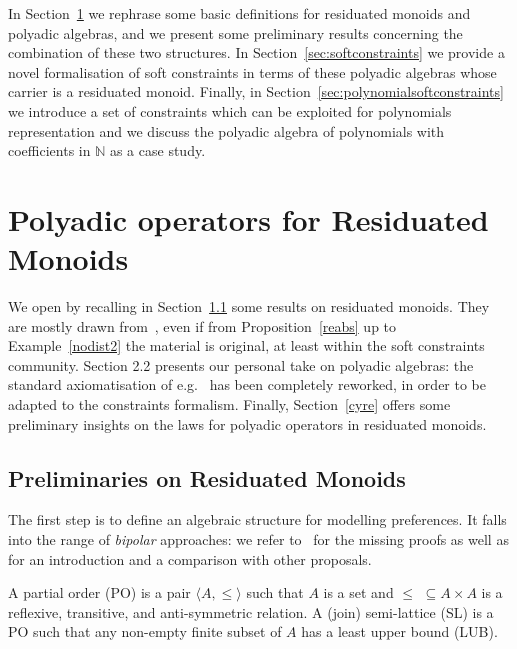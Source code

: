 \documentclass{llncs}
\begin{document}
In Section~\ref{sec:bg} we rephrase some basic definitions for residuated monoids and polyadic algebras, and we present some preliminary results concerning the combination of 
these two structures.
%
In Section~\ref{sec:softconstraints} we provide a novel formalisation of soft constraints in terms of these polyadic algebras whose carrier is a residuated monoid. 
%
Finally, in Section~\ref{sec:polynomialsoftconstraints} we introduce a set of constraints which can be exploited for polynomials representation and we discuss the polyadic algebra of polynomials with coefficients in $\mathbb{N}$ as a case study.

\section{Polyadic operators for Residuated Monoids}\label{sec:bg}

We open by recalling in Section~\ref{sec:lem} some results on residuated monoids.
%
They are mostly drawn from~\cite{jlamp17}, even if from Proposition~\ref{reabs}
up to Example~\ref{nodist2} the material is original, at least within the
soft constraints community.
%
Section 2.2 presents our personal take on polyadic algebras:
the standard axiomatisation of e.g.~\cite{sagi2013} has been completely 
reworked, in order 
to be adapted to the constraints formalism.
%
Finally, Section~\ref{cyre} offers some preliminary insights on 
the laws for polyadic operators in residuated monoids.

\subsection{Preliminaries on Residuated Monoids}\label{sec:lem}

The first step is to define an algebraic structure for modelling preferences. 
It falls into the range of \emph{bipolar} approaches: we refer to~\cite{ipl17} 
for the missing proofs as well as for an introduction and a comparison with other proposals.

\begin{definition}[orders]
	A partial order (PO) is a pair $\langle A, \leq \rangle$ such that
	$A$ is a set %
	and $\leq \,\,\subseteq A \times A$ is a reflexive, transitive, and
	anti-symmetric  relation.
	A (join) semi-lattice (SL) is a PO such that any non-empty finite  subset of $A$ has a
	least upper bound (LUB).
\end{definition}
\end{document}
